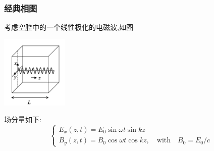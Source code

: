 \begin{frame}
  \frametitle{经典相图}
  考虑空腔中的一个线性极化的电磁波,如图
    \begin{center}
       \includegraphics[width=0.24\textwidth]{figs/2022-04-27-12-37-33.png}
    \end{center}
   场分量如下:  
   \[ \begin{cases}
    E_{x}(z, t)=E_{0} \sin \omega t\sin k z  \\ 
    B_{y}(z, t)=B_{0} \cos \omega t \cos k z,  \quad \text{with} \quad B_{0} = E_{0} /c 
   \end{cases} \]
 \end{frame}
 
%
%

